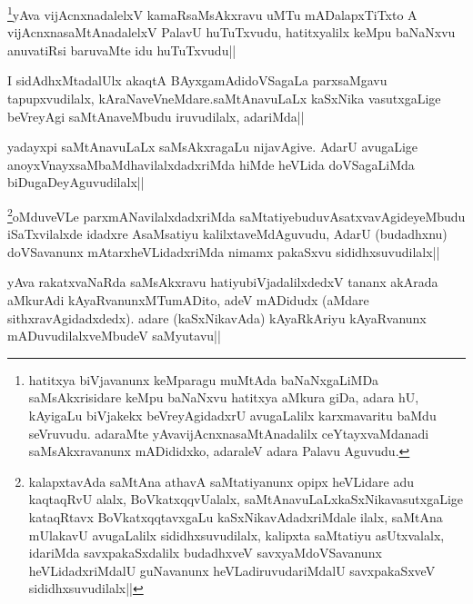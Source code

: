 \begin{artha}
\footnote{hatitxya biVjavanunx keMparagu muMtAda baNaNxgaLiMDa saMsAkxrisidare keMpu baNaNxvu  hatitxya aMkura giDa, adara hU, kAyigaLu biVjakekx beVreyAgidadxrU avugaLalilx karxmavaritu baMdu seVruvudu. adaraMte yAvavijAcnxnasaMtAnadalilx ceYtayxvaMdanadi saMsAkxravanunx mADididxko, adaraleV adara Palavu Aguvudu.}yAva vijAcnxnadalelxV kamaRsaMsAkxravu uMTu mADalapxTiTxto A vijAcnxnasaMtAnadalelxV PalavU huTuTxvudu, hatitxyalilx keMpu baNaNxvu anuvatiRsi baruvaMte idu huTuTxvudu||
\end{artha}

\begin{artha}
I sidAdhxMtadalUlx akaqtA BAyxgamAdidoVSagaLa parxsaMgavu tapupxvudilalx, kAraNaveVneMdare.saMtAnavuLaLx kaSxNika vasutxgaLige beVreyAgi saMtAnaveMbudu iruvudilalx, adariMda||
\end{artha}

\begin{artha}
yadayxpi saMtAnavuLaLx saMsAkxragaLu nijavAgive. AdarU avugaLige anoyxVnayxsaMbaMdhavilalxdadxriMda hiMde heVLida doVSagaLiMda biDugaDeyAguvudilalx||
\end{artha}

\begin{artha}
\footnote{kalapxtavAda saMtAna athavA saMtatiyanunx opipx heVLidare adu kaqtaqRvU alalx,  BoVkatxqqvUalalx, saMtAnavuLaLxkaSxNikavasutxgaLige kataqRtavx BoVkatxqqtavxgaLu kaSxNikavAdadxriMdale ilalx, saMtAna mUlakavU avugaLalilx sididhxsuvudilalx, kalipxta saMtatiyu asUtxvalalx, idariMda savxpakaSxdalilx budadhxveV savxyaMdoVSavanunx heVLidadxriMdalU guNavanunx heVLadiruvudariMdalU savxpakaSxveV sididhxsuvudilalx||}oMduveVLe parxmANavilalxdadxriMda saMtatiyebuduvAsatxvavAgideyeMbudu iSaTxvilalxde idadxre AsaMsatiyu kalilxtaveMdAguvudu, AdarU (budadhxnu) doVSavanunx mAtarxheVLidadxriMda nimamx pakaSxvu sididhxsuvudilalx||
\end{artha}

\begin{artha}
yAva rakatxvaNaRda saMsAkxravu hatiyubiVjadalilxdedxV tananx akArada aMkurAdi kAyaRvanunxMTumADito, adeV mADidudx (aMdare sithxravAgidadxdedx). adare (kaSxNikavAda) kAyaRkAriyu kAyaRvanunx mADuvudilalxveMbudeV saMyutavu||
\end{artha}


